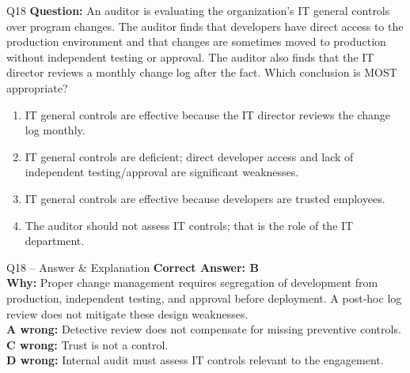 \documentclass[aspectratio=169,10pt]{beamer}
\begin{document}
	\begin{frame}[t]{Q18}
		\small
		\textbf{Question:} An auditor is evaluating the organization's IT general controls over program changes. The auditor finds that developers have direct access to the production environment and that changes are sometimes moved to production without independent testing or approval. The auditor also finds that the IT director reviews a monthly change log after the fact. Which conclusion is MOST appropriate?
		\begin{enumerate}[label=\Alph*.,itemsep=1pt,topsep=2pt]
			\item IT general controls are effective because the IT director reviews the change log monthly.
			\item IT general controls are deficient; direct developer access and lack of independent testing/approval are significant weaknesses.
			\item IT general controls are effective because developers are trusted employees.
			\item The auditor should not assess IT controls; that is the role of the IT department.
		\end{enumerate}
	\end{frame}
	
	\begin{frame}[t]{Q18 -- Answer \& Explanation}
		\small
		\textbf{Correct Answer: B} \\[4pt]
		\textbf{Why:} Proper change management requires segregation of development from production, independent testing, and approval before deployment. A post-hoc log review does not mitigate these design weaknesses. \\[4pt]
		\textbf{A wrong:} Detective review does not compensate for missing preventive controls. \\[2pt]
		\textbf{C wrong:} Trust is not a control. \\[2pt]
		\textbf{D wrong:} Internal audit must assess IT controls relevant to the engagement.
	\end{frame}
	
\end{document}
